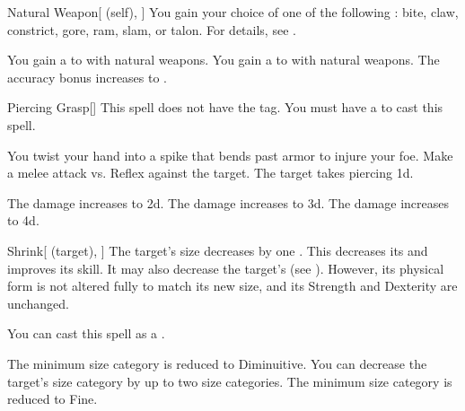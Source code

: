 \lowercase{\hypertarget{spell:Natural Weapon}{}}\label{spell:Natural Weapon}
\begin{attuneability}[Rank 1]{\hypertarget{spell:Natural Weapon}{Natural Weapon}}[ (self), ]
You gain your choice of one of the following : bite, claw, constrict, gore, ram, slam, or talon.
For details, see .

\rankline
{} You gain a   to  with natural weapons.
 You gain a   to  with natural weapons.
 The accuracy bonus increases to .
\end{attuneability}
\vspace{0.25em}



\lowercase{\hypertarget{spell:Piercing Grasp}{}}\label{spell:Piercing Grasp}
\begin{freeability}[Rank 1]{\hypertarget{spell:Piercing Grasp}{Piercing Grasp}}[]
This spell does not have the  tag.
You must have a  to cast this spell.

You twist your hand into a spike that bends past armor to injure your foe.
Make a melee attack vs. Reflex against the target.
\hit The target takes piercing  \plus1d.

\rankline
{} The damage increases to  \plus2d.
 The damage increases to  \plus3d.
 The damage increases to  \plus4d.
\end{freeability}
\vspace{0.25em}



\lowercase{\hypertarget{spell:Shrink}{}}\label{spell:Shrink}
\begin{attuneability}[Rank 1]{\hypertarget{spell:Shrink}{Shrink}}[ (target), ]
The target's size decreases by one .
This decreases its  and improves its  skill.
It may also decrease the target's  (see ).
However, its physical form is not altered fully to match its new size, and its Strength and Dexterity are unchanged.

You can cast this spell as a .

\rankline
{} The minimum size category is reduced to Diminuitive.
 You can decrease the target's size category by up to two size categories.
 The minimum size category is reduced to Fine.
\end{attuneability}
\vspace{0.25em}



